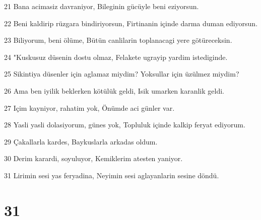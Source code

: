\par 21 Bana acimasiz davraniyor, Bileginin gücüyle beni eziyorsun.
\par 22 Beni kaldirip rüzgara bindiriyorsun, Firtinanin içinde darma duman ediyorsun.
\par 23 Biliyorum, beni ölüme, Bütün canlilarin toplanacagi yere götüreceksin.
\par 24 "Kuskusuz düsenin dostu olmaz, Felakete ugrayip yardim istediginde.
\par 25 Sikintiya düsenler için aglamaz miydim? Yoksullar için üzülmez miydim?
\par 26 Ama ben iyilik beklerken kötülük geldi, Isik umarken karanlik geldi.
\par 27 Içim kayniyor, rahatim yok, Önümde aci günler var.
\par 28 Yasli yasli dolasiyorum, günes yok, Topluluk içinde kalkip feryat ediyorum.
\par 29 Çakallarla kardes, Baykuslarla arkadas oldum.
\par 30 Derim karardi, soyuluyor, Kemiklerim atesten yaniyor.
\par 31 Lirimin sesi yas feryadina, Neyimin sesi aglayanlarin sesine döndü.

\chapter{31}

